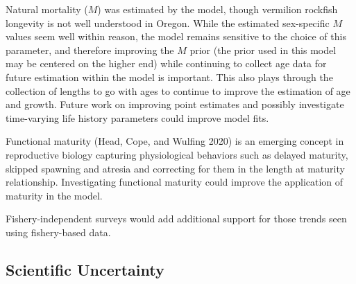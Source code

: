\documentclass[11pt,
  english,
  a4paper,
]{article}
\begin{document}
\leavevmode\tagmcend\tagstructend


Natural mortality ({\(M\)\leavevmode\tagmcend\tagstructend}) was estimated by the model, though vermilion rockfish longevity is not well understood in Oregon. While the estimated sex-specific {\(M\)\leavevmode\tagmcend\tagstructend} values seem well within reason, the model remains sensitive to the choice of this parameter, and therefore improving the {\(M\)\leavevmode\tagmcend\tagstructend} prior (the prior used in this model may be centered on the higher end) while continuing to collect age data for future estimation within the model is important. This also plays through the collection of lengths to go with ages to continue to improve the estimation of age and growth. Future work on improving point estimates and possibly investigate time-varying life history parameters could improve model fits.

\leavevmode\tagmcend\tagstructend\par


Functional maturity {(Head, Cope, and Wulfing 2020)\leavevmode\tagmcend\tagstructend} is an emerging concept in reproductive biology capturing physiological behaviors such as delayed maturity, skipped spawning and atresia and correcting for them in the length at maturity relationship. Investigating functional maturity could improve the application of maturity in the model.

\leavevmode\tagmcend\tagstructend\par


Fishery-independent surveys would add additional support for those trends seen using fishery-based data.

\leavevmode\tagmcend\tagstructend\par


\hypertarget{scientific-uncertainty}{%
\subsection*{Scientific Uncertainty}\label{scientific-uncertainty}}
\end{document}
